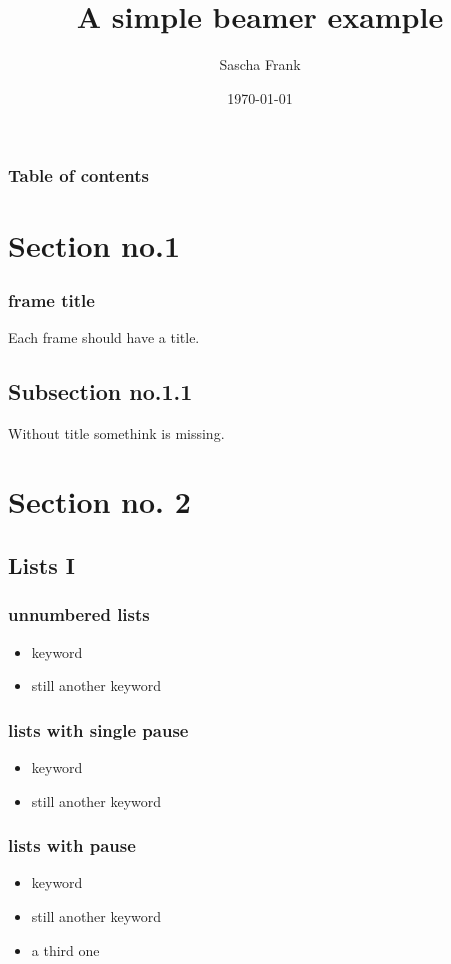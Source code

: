 \documentclass[hyperref={pdfpagelabels=false}]{beamer}
\title{A simple beamer example}
\author{Sascha Frank}
\date{\today}
\begin{document}
\begin{frame}
\titlepage
\end{frame} 

\begin{frame}
\frametitle{Table of contents}
\tableofcontents
\end{frame}
 
\section{Section no.1} 
\begin{frame}
\frametitle{frame title} 
Each frame should have a title.
\end{frame}

\subsection{Subsection no.1.1  }
\begin{frame}
Without title somethink is missing. 
\end{frame}


\section{Section no. 2} 
\subsection{Lists I}
\begin{frame}
\frametitle{unnumbered lists}
\begin{itemize}
\item keyword
\item still another keyword
\end{itemize} 
\end{frame}

\begin{frame}
\frametitle{lists with single pause}
\begin{itemize}
\item keyword  \pause 
\item still another keyword
\end{itemize} 
\end{frame}

\begin{frame}
\frametitle{lists with pause}
\begin{itemize}[<+->]
\item keyword  
\item still another keyword
\item a third one 
\end{itemize} 
\end{frame}
\end{document}
